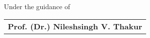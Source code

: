 \begin{titlepage}
\begin{table}[H]
    \centering
        Under the guidance of\\
    \large
        \vspace{1 em}
    \begin{tabu} to \linewidth {C}
        \textbf{Prof. (Dr.) Nileshsingh V. Thakur}
    \end{tabu}
\end{table}



\mbox{}
    \vfill
    \large
    \textcolor{white}{\placeanddate}
\end{titlepage}